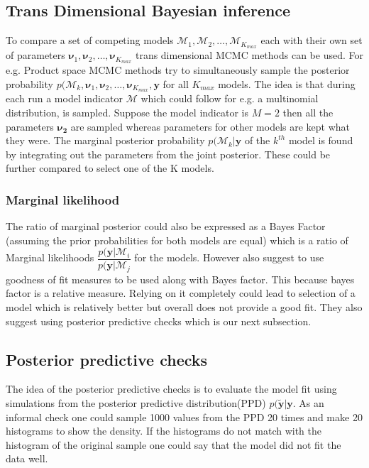 \subsection{Trans Dimensional Bayesian inference}
To compare a set of competing models $\mathcal{M}_1, \mathcal{M}_2, \ldots, \mathcal{M}_{K_{max}}$ each with their own set of parameters $\boldsymbol{\nu}_1, \boldsymbol{\nu}_2, \ldots, \boldsymbol{\nu}_{K_{max}}$ trans dimensional MCMC methods can be used. For e.g. Product space MCMC methods try to simultaneously sample the posterior probability $p(\mathcal{M}_{k}, \boldsymbol{\nu}_1, \boldsymbol{\nu}_2, \ldots, \boldsymbol{\nu}_{K_{max}}, \boldsymbol{y}$ for all $K_{max}$ models. The idea is that during each run a model indicator $\mathcal{M}$ which could follow for e.g. a multinomial distribution, is sampled. Suppose the model indicator is $M=2$ then all the parameters $\boldsymbol{\nu_{2}}$ are sampled whereas parameters for other models are kept what they were. The marginal posterior probability $p(\mathcal{M}_k|\boldsymbol{y}$ of the $k^{th}$ model is found by integrating out the parameters from the joint posterior. These could be further compared to select one of the K models.\\

\subsubsection{Marginal likelihood}
The ratio of marginal posterior could also be expressed as a Bayes Factor (assuming the prior probabilities for both models are equal) which is a ratio of Marginal likelihoods $\dfrac{p(\boldsymbol{y}|\mathcal{M}_i}{p(\boldsymbol{y}|\mathcal{M}_j}$ for the models. 
However \citet{johannes_berkhof_bayesian_2003} also suggest to use goodness of fit measures to be used along with Bayes factor. This because bayes factor is a relative measure. Relying on it completely could lead to selection of a model which is relatively better but overall does not provide a good fit. They also suggest using posterior predictive checks which is our next subsection.

\subsection{Posterior predictive checks}
The idea of the posterior predictive checks is to evaluate the model fit using simulations from the posterior predictive distribution(PPD) $p(\boldsymbol{\tilde{y}}|\boldsymbol{y}$. As an informal check one could sample 1000 values from the PPD 20 times and make 20 histograms to show the density. If the histograms do not match with the histogram of the original sample one could say that the model did not fit the data well.\\ 

